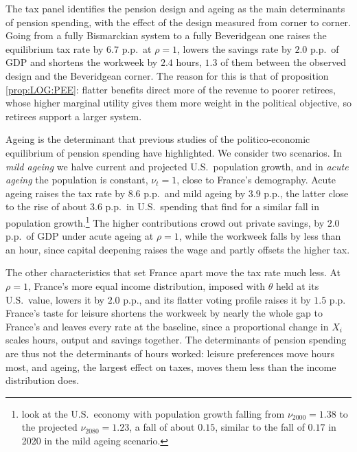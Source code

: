 The tax panel identifies the pension design and ageing as the main determinants of pension spending, with the effect of the design measured from corner to corner. Going from a fully Bismarckian system to a fully Beveridgean one raises the equilibrium tax rate by $6.7$ p.p.\ at $\rho = 1$, lowers the savings rate by $2.0$ p.p.\ of GDP and shortens the workweek by $2.4$ hours, $1.3$ of them between the observed design and the Beveridgean corner. The reason for this is that of proposition \ref{prop:LOG:PEE}: flatter benefits direct more of the revenue to poorer retirees, whose higher marginal utility gives them more weight in the political objective, so retirees support a larger system.

Ageing is the determinant that previous studies of the politico-economic equilibrium of pension spending have highlighted. We consider two scenarios. In {\it mild ageing} we halve current and projected U.S.\ population growth, and in {\it acute ageing} the population is constant, $\nu_t = 1$, close to France's demography. Acute ageing raises the tax rate by $8.6$ p.p.\ and mild ageing by $3.9$ p.p., the latter close to the rise of about $3.6$ p.p.\ in U.S.\ spending that \textcite{mkvss08} find for a similar fall in population growth.\footnote{\textcite{mkvss08} look at the U.S.\ economy with population growth falling from $\nu_{2000} = 1.38$ to the projected $\nu_{2080} = 1.23$, a fall of about $0.15$, similar to the fall of $0.17$ in 2020 in the mild ageing scenario.} The higher contributions crowd out private savings, by $2.0$ p.p.\ of GDP under acute ageing at $\rho = 1$, while the workweek falls by less than an hour, since capital deepening raises the wage and partly offsets the higher tax.

The other characteristics that set France apart move the tax rate much less. At $\rho = 1$, France's more equal income distribution, imposed with $\theta$ held at its U.S.\ value, lowers it by $2.0$ p.p., and its flatter voting profile raises it by $1.5$ p.p. France's taste for leisure shortens the workweek by nearly the whole gap to France's and leaves every rate at the baseline, since a proportional change in $X_i$ scales hours, output and savings together. The determinants of pension spending are thus not the determinants of hours worked: leisure preferences move hours most, and ageing, the largest effect on taxes, moves them less than the income distribution does.

